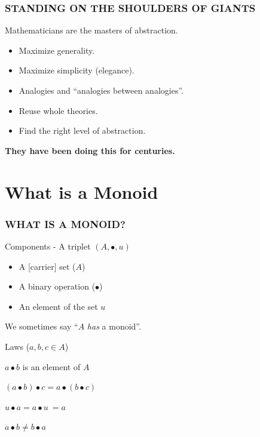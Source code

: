 \documentclass{beamer}
\begin{document}
\begin{frame} \frametitle{STANDING ON THE SHOULDERS OF GIANTS}
  Mathematicians are the \alert{masters of abstraction.}
  \begin{itemize}
  \item Maximize generality.
  \item Maximize simplicity (elegance).
  \item Analogies and ``analogies between analogies''.
  \item Reuse whole theories.
  \item Find the right level of abstraction.
  \end{itemize}

  \begin{block}{}
    \centering \Large
    \textbf{They have been doing this for centuries.}
  \end{block}
\end{frame}


\section{What is a Monoid}

\begin{frame} \frametitle{WHAT IS A MONOID?}
  \begin{block}{Components - A triplet \((A, \bullet, u)\)}
  \begin{itemize}
    \item A [carrier] \alert{set} (\(A\))
    \item A binary \alert{operation} (\(\bullet\))
    \item An \alert{element} of the set \(u\)
  \end{itemize}
  We sometimes say ``\(A\) \emph{has} a monoid''.
  \end{block}

  \pause

  \begin{block}{Laws (\(a,b,c \in A\))}

  \begin{description}[Commutativity:]
    \item[Closure:] \(a \bullet b\) is an element of \(A\)
    \item[Associativity:] \((a \bullet b) \bullet c = a \bullet (b \bullet c)\)
    \item[Identity:] \(u \bullet a = a \bullet u \ = a\)
    \item[\sout{Commutativity:}] \(a \bullet b \neq b \bullet a\)
  \end{description}
  \end{block}
\end{frame}
\end{document}
